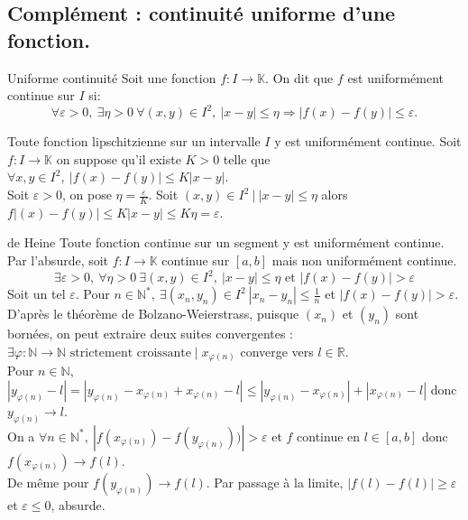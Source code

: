 \documentclass[11pt]{article}
\newcommand*{\K}{\mathbb{K}}
\newcommand*{\R}{\mathbb{R}}
\newcommand*{\N}{\mathbb{N}}
\newcommand{\0}{\varnothing}
\newcommand*{\e}{\varepsilon}
\renewcommand*{\phi}{\varphi}
\begin{document}
\subsection{Complément : continuité uniforme d'une fonction.}

\begin{defi}{Uniforme continuité}{}
    Soit une fonction $f:I\to\K$. On dit que $f$ est uniformément continue sur $I$ si:
    \begin{equation*}
        \forall \e>0, ~ \exists \eta > 0 ~ \forall (x,y) \in I^2, ~ |x-y|\leq\eta \Longrightarrow |f(x)-f(y)|\leq\e.
    \end{equation*}
\end{defi}

\begin{prop}{}{}
    Toute fonction lipschitzienne sur un intervalle $I$ y est uniformément continue.
    \tcblower
    Soit $f:I\to\K$ on suppose qu'il existe $K>0$ telle que $\forall x,y\in I^2, ~ |f(x)-f(y)|\leq K|x-y|$.\\
    Soit $\e>0$, on pose $\eta=\frac{\e}{K}$. Soit $(x,y)\in I^2 ~ | ~ |x-y|\leq\eta$ alors $f|(x)-f(y)|\leq K|x-y| \leq K\eta = \e$.
\end{prop}

\begin{thm}{de Heine}{}
    Toute fonction continue sur un segment y est uniformément continue.
    \tcblower
    Par l'absurde, soit $f:I\to\K$ continue sur $[a,b]$ mais non uniformément continue.
    \begin{equation*}
        \exists \e > 0, ~ \forall \eta > 0 ~ \exists (x,y)\in I^2, ~ |x-y|\leq\eta \text{ et } |f(x)-f(y)|>\e 
    \end{equation*}
    Soit un tel $\e$. Pour $n\in\N^*, ~ \exists(x_n,y_n)\in I^2 ~ |x_n-y_n| \leq \frac{1}{n}$ et $|f(x)-f(y)|>\e$.\\
    D'après le théorème de Bolzano-Weierstrass, puisque $(x_n)$ et $(y_n)$ sont bornées, on peut extraire deux suites convergentes : $\exists \phi:\N\to\N \text{ strictement croissante} \mid x_{\phi(n)}$ converge vers $l\in\R$.\\
    Pour $n\in\N$, $|y_{\phi(n)}-l|=|y_{\phi(n)}-x_{\phi(n)}+x_{\phi(n)}-l|\leq|y_{\phi(n)}-x_{\phi(n)}|+|x_{\phi(n)}-l|$ donc $y_{\phi(n)}\to l$.\\
    On a $\forall n\in\N^*, ~ |f(x_{\phi(n)})-f(y_{\phi(n)}))|>\e$ et $f$ continue en $l\in[a,b]$ donc $f(x_{\phi(n)})\to f(l)$.\\
    De même pour $f(y_{\phi(n)})\to f(l)$. Par passage à la limite, $|f(l)-f(l)|\geq\e$ et $\e\leq0$, absurde.
\end{thm}
\end{document}
